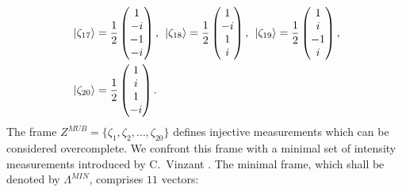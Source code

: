 \documentclass[aps,pra,reprint,groupedaddress,showkeys]{revtex4-1}
\begin{document}
\begin{equation}
\begin{split}
&\ket{\zeta_{17}} = \frac{1}{2}\begin{pmatrix} 1 \\ -i \\ -1 \\ -i \end{pmatrix}, \hspace{0.15cm} \ket{\zeta_{18}} = \frac{1}{2}\begin{pmatrix} 1  \\ -i \\ 1 \\ i \end{pmatrix}, \hspace{0.15cm} \ket{\zeta_{19}} = \frac{1}{2}\begin{pmatrix} 1  \\i \\ -1 \\i \end{pmatrix},\\
& \ket{\zeta_{20}} = \frac{1}{2}\begin{pmatrix} 1  \\ i \\ 1 \\-i \end{pmatrix}.\\
\end{split}
\end{equation}
The frame $Z^{MUB} = \{ \zeta_1, \zeta_2, \dots, \zeta_{20}\}$ defines injective measurements which can be considered overcomplete. We confront this frame with a minimal set of intensity measurements introduced by C.~Vinzant \cite{vinzant15}. The minimal frame, which shall be denoted by $\Lambda^{MIN}$, comprises $11$ vectors:
\end{document}

